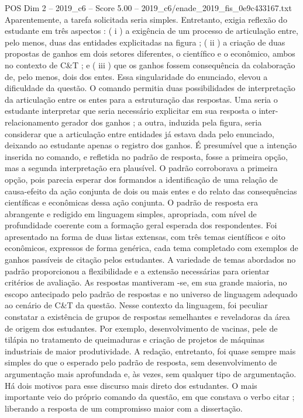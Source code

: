 \begin{textsample}{POS Dim 2 – 2019\_c6 – Score 5.00 – 2019\_c6/enade\_2019\_fis\_0e9c433167.txt}
Aparentemente, a tarefa solicitada seria simples.
Entretanto, exigia reflexão do estudante em três aspectos : ( i ) a exigência de um processo de articulação entre, pelo menos, duas das entidades explicitadas na figura ; ( ii ) a criação de duas propostas de ganhos em dois setores diferentes, o científico e o econômico, ambos no contexto de C\&T ; e ( iii ) que os ganhos fossem consequência da colaboração de, pelo menos, dois dos entes.
Essa singularidade do enunciado, elevou a dificuldade da questão.
O comando permitia duas possibilidades de interpretação da articulação entre os entes para a estruturação das respostas.
Uma seria o estudante interpretar que seria necessário explicitar em sua resposta o inter-relacionamento gerador dos ganhos ; a outra, induzida pela figura, seria considerar que a articulação entre entidades já estava dada pelo enunciado, deixando ao estudante apenas o registro dos ganhos.
É presumível que a intenção inserida no comando, e refletida no padrão de resposta, fosse a primeira opção, mas a segunda interpretação era plausível.
O padrão corroborava a primeira opção, pois parecia esperar dos formandos a identificação de uma relação de causa-efeito da ação conjunta de dois ou mais entes e do relato das consequências científicas e econômicas dessa ação conjunta.
O padrão de resposta era abrangente e redigido em linguagem simples, apropriada, com nível de profundidade coerente com a formação geral esperada dos respondentes.
Foi apresentado na forma de duas listas extensas, com três temas científicos e oito econômicos, expressos de forma genérica, cada tema completado com exemplos de ganhos passíveis de citação pelos estudantes.
A variedade de temas abordados no padrão proporcionou a flexibilidade e a extensão necessárias para orientar critérios de avaliação.
As respostas mantiveram -se, em sua grande maioria, no escopo antecipado pelo padrão de respostas e no universo de linguagem adequado ao cenário de C\&T da questão.
Nesse contexto da linguagem, foi peculiar constatar a existência de grupos de respostas semelhantes e reveladoras da área de origem dos estudantes.
Por exemplo, desenvolvimento de vacinas, pele de tilápia no tratamento de queimaduras e criação de projetos de máquinas industriais de maior produtividade.
A redação, entretanto, foi quase sempre mais simples do que o esperado pelo padrão de resposta, sem desenvolvimento de argumentação mais aprofundada e, às vezes, sem qualquer tipo de argumentação.
Há dois motivos para esse discurso mais direto dos estudantes.
O mais importante veio do próprio comando da questão, em que constava o verbo citar ; liberando a resposta de um compromisso maior com a dissertação.

\end{textsample}
